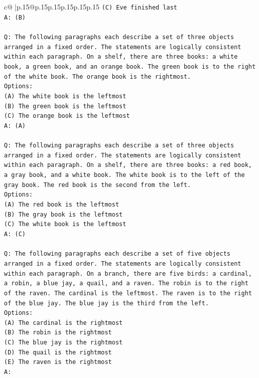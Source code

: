 \documentclass{article}
\begin{document}
{\begin{supertabular}{c@{$\;$}|p{.15\linewidth}@{}p{.15\linewidth}p{.15\linewidth}p{.15\linewidth}p{.15\linewidth}p{.15\linewidth}}
{{{\texttt{(C) Eve finished last} \\
\texttt{A: (B)} \\
\\ 
\texttt{Q: The following paragraphs each describe a set of three objects arranged in a fixed order. The statements are logically consistent within each paragraph. On a shelf, there are three books: a white book, a green book, and an orange book. The green book is to the right of the white book. The orange book is the rightmost.} \\
\texttt{Options:} \\
\texttt{(A) The white book is the leftmost} \\
\texttt{(B) The green book is the leftmost} \\
\texttt{(C) The orange book is the leftmost} \\
\texttt{A: (A)} \\
\\ 
\texttt{Q: The following paragraphs each describe a set of three objects arranged in a fixed order. The statements are logically consistent within each paragraph. On a shelf, there are three books: a red book, a gray book, and a white book. The white book is to the left of the gray book. The red book is the second from the left.} \\
\texttt{Options:} \\
\texttt{(A) The red book is the leftmost} \\
\texttt{(B) The gray book is the leftmost} \\
\texttt{(C) The white book is the leftmost} \\
\texttt{A: (C)} \\
\\ 
\texttt{Q: The following paragraphs each describe a set of five objects arranged in a fixed order. The statements are logically consistent within each paragraph. On a branch, there are five birds: a cardinal, a robin, a blue jay, a quail, and a raven. The robin is to the right of the raven. The cardinal is the leftmost. The raven is to the right of the blue jay. The blue jay is the third from the left.} \\
\texttt{Options:} \\
\texttt{(A) The cardinal is the rightmost} \\
\texttt{(B) The robin is the rightmost} \\
\texttt{(C) The blue jay is the rightmost} \\
\texttt{(D) The quail is the rightmost} \\
\texttt{(E) The raven is the rightmost} \\
\texttt{A:} \\
            }
        }
    }
     \\ \\


\end{supertabular}}
\end{document}
